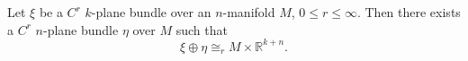 Let $\xi$ be a $C^r$ $k$-plane bundle over an $n$-manifold $M$, $0 \leqslant r \leqslant \infty$. Then there exists a $C^r$ $n$-plane bundle $\eta$ over $M$ such that
$$\xi \oplus \eta \cong_r M \times \mathbb{R}^{k+n}.$$
